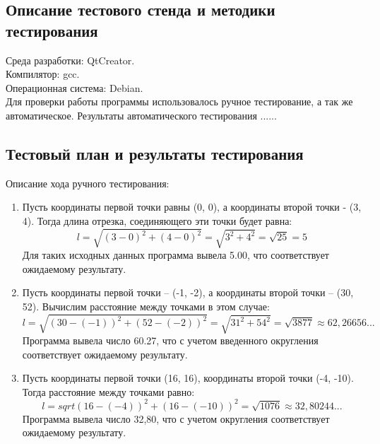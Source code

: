\documentclass[12pt,a4paper]{report}
\begin{document}
\subsection{Описание тестового стенда и методики тестирования}
Среда разработки: QtCreator.\\
Компилятор: gcc. \\
Операционная система: Debian. \\
Для проверки работы программы использовалось ручное тестирование, а так же автоматическое. Результаты автоматического тестирования ......
\subsection{Тестовый план и результаты тестирования}
Описание хода ручного тестирования:
\begin{enumerate}
\item
Пусть координаты первой точки равны (0, 0), а координаты второй точки - (3, 4). Тогда длина отрезка, соединяющего эти точки будет равна: 
\begin{equation}
l = \sqrt{(3 - 0) ^ 2 + (4 - 0) ^ 2} = \sqrt{3 ^ 2 + 4 ^ 2} = \sqrt{25} = 5
\end{equation}
Для таких исходных данных программа вывела 5.00, что соответствует ожидаемому результату.
\item 
Пусть координаты первой точки -- (-1, -2), а координаты второй точки -- (30, 52). Вычислим расстояние между точками в этом случае:
\begin{equation}
l = \sqrt{(30 - (-1))^2 + (52 - (-2))^2} = \sqrt{31^2 + 54^2} = \sqrt{3877} \approx 62,26656...
\end{equation}
Программа вывела число 60.27, что с учетом введенного округления соответствует ожидаемому результату.
\item
Пусть координаты первой точки (16, 16), координаты второй точки (-4, -10). Тогда расстояние между точками равно:
\begin{equation}
l = sqrt{(16 - (-4))^2 + (16 - (-10))^2} = \sqrt{1076} \approx 32,80244...
\end{equation}
Программа вывела число 32,80, что с учетом округления соответствует ожидаемому результату. 
\end{enumerate} 
\end{document}
